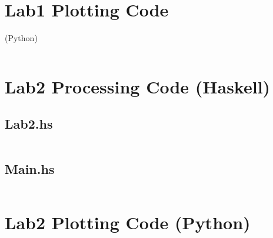 \documentclass[a4paper]{article}
\begin{document}
\section{Lab1 Plotting Code} (Python)
\inputminted{python}{../src/AI/Lab1/plotting.py}


\section{Lab2 Processing Code (Haskell)}

\subsection{Lab2.hs}
\inputminted{haskell}{../src/AI/Lab2/Lab2.hs}

\subsection{Main.hs}
\inputminted{haskell}{../src/AI/Lab2/Main.hs}


\section{Lab2 Plotting Code (Python)}
\inputminted{python}{../src/AI/Lab2/plotting.py}
\end{document}
